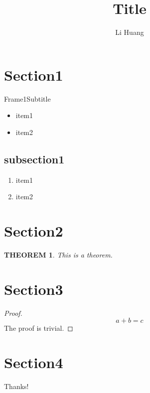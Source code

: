 \documentclass{beamer}
\title[Short Title]{Title}
\author{Li Huang}
\institute{SUSTech}
\newtheorem{thm}{THEOREM}
\begin{document}
    \begin{frame}
        \titlepage
    \end{frame}

    \begin{frame}
        \tableofcontents
    \end{frame}

    \section{Section1}

    \begin{frame}{Frame1}{Subtitle}
        \begin{itemize}
            \item item1
            \item item2
        \end{itemize}
    \end{frame}

    \subsection{subsection1}

    \begin{frame}
        \begin{enumerate}
            \item item1
            \item item2
        \end{enumerate}
    \end{frame}

    \section{Section2}

    \begin{frame}
        \begin{thm}
            This is a theorem.
        \end{thm}
    \end{frame}
    
    \section{Section3}
    
    \begin{frame}
        \begin{proof}
            \begin{equation}
                a + b = c
            \end{equation}
            The proof is trivial.
        \end{proof}
    \end{frame}
    
    \section{Section4}
    
    \begin{frame}
        \centering
        \Huge\calligra Thanks!
    \end{frame}
    
\end{document}
